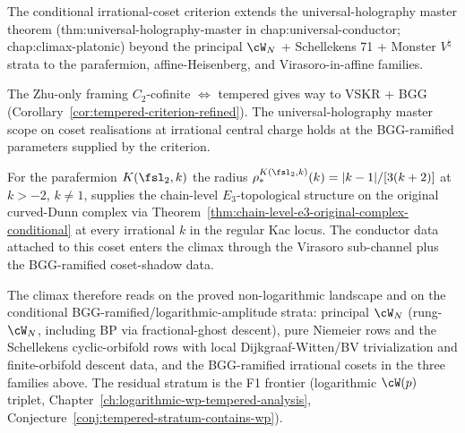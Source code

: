 \begin{remark}%
\label{rem:anchor-irrational-cosets}%
%
%
%
The conditional irrational-coset criterion extends the
universal-holography master
theorem (\textsf{thm:universal-holography-master} in
\textsf{chap:universal-conductor}; \textsf{chap:climax-platonic})
beyond the principal $\cW_N$ + Schellekens 71 + Monster $V^\natural$
strata to the parafermion, affine-Heisenberg, and Virasoro-in-affine
families.

The Zhu-only framing $C_2$-cofinite $\Leftrightarrow$ tempered gives
way to VSKR + BGG
(Corollary~\ref{cor:tempered-criterion-refined}). The
universal-holography master scope on coset realisations at irrational
central charge holds at the BGG-ramified parameters supplied by the
criterion.

For the parafermion $K(\fsl_2, k)$ the radius
$\rho_*^{K(\fsl_2,k)}(k) = |k - 1|/[3(k+2)]$ at $k > -2$, $k \ne 1$,
supplies the chain-level $E_3$-topological structure on the original
curved-Dunn complex via
Theorem~\ref{thm:chain-level-e3-original-complex-conditional} at
every irrational $k$ in the regular Kac locus. The conductor data
attached to this coset enters the climax through the Virasoro
sub-channel plus the BGG-ramified coset-shadow data.

The climax therefore reads on the proved non-logarithmic landscape
and on the conditional BGG-ramified/logarithmic-amplitude strata:
principal $\cW_N$ (rung-$\cW_N$, including BP via fractional-ghost
descent), pure Niemeier rows and the Schellekens cyclic-orbifold rows
with local Dijkgraaf-Witten/BV trivialization and finite-orbifold
descent data, and the BGG-ramified irrational cosets in the three
families above. The residual stratum is the F1 frontier (logarithmic
$\cW(p)$ triplet, Chapter~\ref{ch:logarithmic-wp-tempered-analysis},
Conjecture~\ref{conj:tempered-stratum-contains-wp}).
\end{remark}
